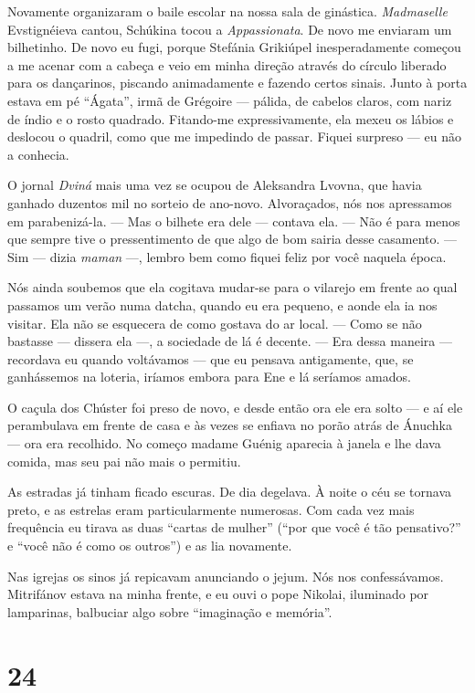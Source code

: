 Novamente organizaram o baile escolar na nossa sala de ginástica.
\emph{Madmaselle} Evstignéieva cantou, Schúkina tocou a
\emph{Appassionata}. De novo me enviaram um bilhetinho. De novo eu fugi,
porque Stefánia Grikiúpel inesperadamente começou a me acenar com a
cabeça e veio em minha direção através do círculo liberado para os
dançarinos, piscando animadamente e fazendo certos sinais. Junto à porta
estava em pé ``Ágata'', irmã de Grégoire --- pálida, de cabelos claros,
com nariz de índio e o rosto quadrado. Fitando-me expressivamente, ela
mexeu os lábios e deslocou o quadril, como que me impedindo de passar.
Fiquei surpreso --- eu não a conhecia.

O jornal \emph{Dviná} mais uma vez se ocupou de Aleksandra Lvovna, que
havia ganhado duzentos mil no sorteio de ano-novo. Alvoraçados, nós nos
apressamos em parabenizá-la. --- Mas o bilhete era dele --- contava ela.
--- Não é para menos que sempre tive o pressentimento de que algo de bom
sairia desse casamento. --- Sim --- dizia \emph{maman} ---, lembro bem
como fiquei feliz por você naquela época.

Nós ainda soubemos que ela cogitava mudar-se para o vilarejo em frente
ao qual passamos um verão numa datcha, quando eu era pequeno, e aonde
ela ia nos visitar. Ela não se esquecera de como gostava do ar local.
--- Como se não bastasse --- dissera ela ---, a sociedade de lá é
decente. --- Era dessa maneira --- recordava eu quando voltávamos ---
que eu pensava antigamente, que, se ganhássemos na loteria, iríamos
embora para Ene e lá seríamos amados.

O caçula dos Chúster foi preso de novo, e desde então ora ele era solto
--- e aí ele perambulava em frente de casa e às vezes se enfiava no
porão atrás de Ánuchka --- ora era recolhido. No começo madame Guénig
aparecia à janela e lhe dava comida, mas seu pai não mais o permitiu.

As estradas já tinham ficado escuras. De dia degelava. À noite o céu se
tornava preto, e as estrelas eram particularmente numerosas. Com cada
vez mais frequência eu tirava as duas ``cartas de mulher'' (``por que
você é tão pensativo?'' e ``você não é como os outros'') e as lia
novamente.

Nas igrejas os sinos já repicavam anunciando o jejum. Nós nos
confessávamos. Mitrifánov estava na minha frente, e eu ouvi o pope
Nikolai, iluminado por lamparinas, balbuciar algo sobre ``imaginação e
memória''.

\section{24}

